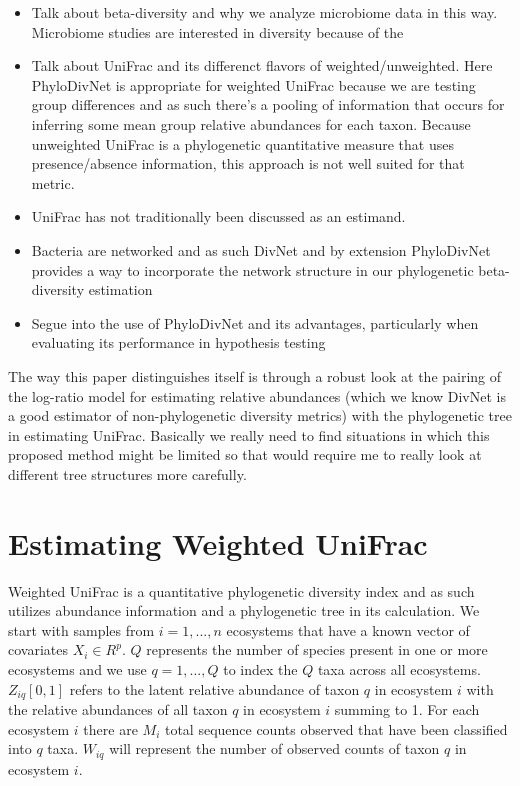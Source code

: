 \documentclass{article}
\begin{document}
\begin{itemize}
\item Talk about beta-diversity and why we analyze microbiome data in this way.
Microbiome studies are interested in diversity because of the
\item Talk about UniFrac and its differenct flavors of weighted/unweighted.
\subitem Here PhyloDivNet is appropriate for weighted UniFrac because we are testing group differences and as such there's a pooling of information that occurs for inferring some mean group relative abundances for each taxon. Because unweighted UniFrac is a phylogenetic quantitative measure that uses presence/absence information, this approach is not well suited for that metric.
\item UniFrac has not traditionally been discussed as an estimand.
\item Bacteria are networked and as such DivNet and by extension PhyloDivNet provides a way to incorporate the network structure in our phylogenetic beta-diversity estimation
\item  Segue into the use of PhyloDivNet and its advantages, particularly when evaluating its performance in hypothesis testing
\end{itemize}

\item The way this paper distinguishes itself is through a robust look at the pairing of the log-ratio model for estimating relative abundances (which we know DivNet is a good estimator of non-phylogenetic diversity metrics) with the phylogenetic tree in estimating UniFrac. Basically we really need to find situations in which this proposed method might be limited so that would require me to really look at different tree structures more carefully.



\section{Estimating Weighted UniFrac}

Weighted UniFrac is a quantitative phylogenetic diversity index and as such utilizes abundance information and a phylogenetic tree in its calculation. We start with samples from $i = 1,..., n$ ecosystems that have a known vector of covariates $X_i \in R^p$. $Q$ represents the number of species present in one or more ecosystems and we use $q = 1,...,Q$ to index the $Q$ taxa across all ecosystems. $Z_{iq} [0,1]$ refers to the latent relative abundance of taxon $q$ in ecosystem $i$ with the relative abundances of all taxon $q$ in ecosystem $i$ summing to 1. For each ecosystem $i$ there are $M_i$ total sequence counts observed that have been classified into $q$ taxa. $W_{iq}$ will represent the number of observed counts of taxon $q$ in ecosystem $i$.
\end{document}
